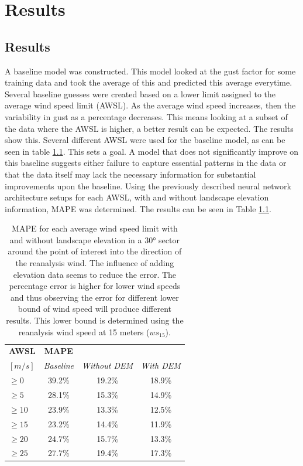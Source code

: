 \chapter{Results}
\label{Chapter5}
\section{Results}
A baseline model was constructed. This model looked at the gust factor for some training data and took the average of this and predicted this average everytime. Several baseline guesses were created based on a lower limit assigned to the average wind speed limit (AWSL). As the average wind speed increases, then the variability in gust as a percentage decreases\cite{mean_gust_HA_HO}. This means looking at a subset of the data where the AWSL is higher, a better result can be expected. The results show this. Several different AWSL were used for the baseline model, as can be seen in table \ref{table:results}. This sets a goal. A model that does not significantly improve on this baseline suggests either failure to capture essential patterns in the data or that the data itself may lack the necessary information for substantial improvements upon the baseline. Using the previously described neural network architecture setups for each AWSL, with and without landscape elevation information, MAPE was determined. The results can be seen in Table \ref{table:results}.

\begin{table}[h]
    \caption[Model results for different AWSL]{MAPE for each average wind speed limit with and without landscape elevation in a 30° sector around the point of interest into the direction of the reanalysis wind. The influence of adding elevation data seems to reduce the error. The percentage error is higher for lower wind speeds and thus observing the error for different lower bound of wind speed will produce different results. This lower bound is determined using the reanalysis wind speed at 15 meters ($ws_{15}$).}
    \label{table:results}
    \centering
    \begin{tabular}{lccc}
        \toprule
        \textbf{AWSL} & \textbf{MAPE} & &\\ 
        $[m/s]$ & \textit{Baseline} &  \textit{Without DEM} & \textit{With DEM} \\
        \midrule
        $\geq 0$ & 39.2\% & 19.2\% & 18.9\% \\
        $\geq 5$ & 28.1\% & 15.3\% & 14.9\%\\
        $\geq 10$ & 23.9\% & 13.3\% & 12.5\%\\
        $\geq 15$ & 23.2\% & 14.4\% & 11.9\%\\
        $\geq 20$ & 24.7\% & 15.7\% & 13.3\%\\
        $\geq 25$ & 27.7\% & 19.4\% & 17.3\%\\
        \bottomrule
    \end{tabular}
\end{table}


